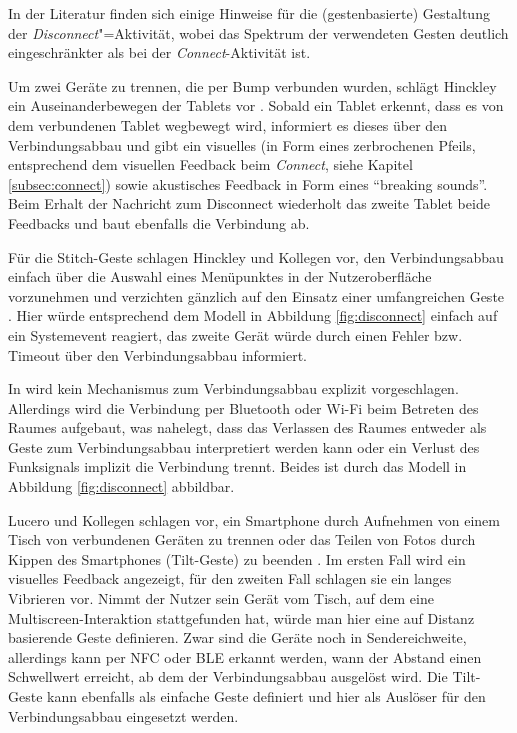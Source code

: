 In der Literatur finden sich einige Hinweise für die (gestenbasierte) Gestaltung der \textit{Disconnect}"=Aktivität, wobei das Spektrum der verwendeten Gesten deutlich eingeschränkter als bei der \textit{Connect}-Aktivität ist.

Um zwei Geräte zu trennen, die per Bump verbunden wurden, schlägt Hinckley ein Auseinanderbewegen der Tablets vor \citep{Hinckley2003}. Sobald ein Tablet erkennt, dass es von dem verbundenen Tablet wegbewegt wird, informiert es dieses über den Verbindungsabbau und gibt ein visuelles (in Form eines zerbrochenen Pfeils, entsprechend dem visuellen Feedback beim \textit{Connect}, siehe Kapitel \ref{subsec:connect}) sowie akustisches Feedback in Form eines "`breaking sounds"'. Beim Erhalt der Nachricht zum Disconnect wiederholt das zweite Tablet beide Feedbacks und baut ebenfalls die Verbindung ab.

Für die Stitch-Geste schlagen Hinckley und Kollegen vor, den Verbindungsabbau einfach über die Auswahl eines Menüpunktes in der Nutzeroberfläche vorzunehmen und verzichten gänzlich auf den Einsatz einer umfangreichen Geste \citep{Hinckley2004}. Hier würde entsprechend dem Modell in Abbildung \ref{fig:disconnect} einfach auf ein Systemevent reagiert, das zweite Gerät würde durch einen Fehler bzw. Timeout über den Verbindungsabbau informiert.

In \citep{Dachselt2009} wird kein Mechanismus zum Verbindungsabbau explizit vorgeschlagen. Allerdings wird die Verbindung per Bluetooth oder Wi-Fi beim Betreten des Raumes aufgebaut, was nahelegt, dass das Verlassen des Raumes entweder als Geste zum Verbindungsabbau interpretiert werden kann oder ein Verlust des Funksignals implizit die Verbindung trennt. Beides ist durch das Modell in Abbildung \ref{fig:disconnect} abbildbar.

Lucero und Kollegen schlagen vor, ein Smartphone durch Aufnehmen von einem Tisch von verbundenen Geräten zu trennen oder das Teilen von Fotos durch Kippen des Smartphones (Tilt-Geste) zu beenden \citep{Lucero2011}. Im ersten Fall wird ein visuelles Feedback angezeigt, für den zweiten Fall schlagen sie ein langes Vibrieren vor. Nimmt der Nutzer sein Gerät vom Tisch, auf dem eine Multiscreen-Interaktion stattgefunden hat, würde man hier eine auf Distanz basierende Geste definieren. Zwar sind die Geräte noch in Sendereichweite, allerdings kann \zb per NFC oder BLE erkannt werden, wann der Abstand einen Schwellwert erreicht, ab dem der Verbindungsabbau ausgelöst wird. Die Tilt-Geste kann ebenfalls als einfache Geste definiert und hier als Auslöser für den Verbindungsabbau eingesetzt werden.

